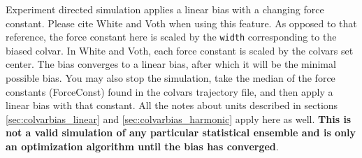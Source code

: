 
Experiment directed simulation applies a linear bias with a changing
force constant. Please cite White and Voth \cite{White2014} when
using this feature. As opposed to that reference, the force constant here is scaled
by the \texttt{width} corresponding to the biased colvar. In White and
Voth, each force constant is scaled by the colvars set center. The
bias converges to a linear bias, after which it will be the minimal
possible bias. You may also stop the simulation, take the median of
the force constants (ForceConst) found in the colvars trajectory file,
and then apply a linear bias with that constant. All the notes about
units described in sections \ref{sec:colvarbias_linear}
and \ref{sec:colvarbias_harmonic} apply here as well. {\bf This is not
a valid simulation of any particular statistical ensemble and is only
an optimization algorithm until the bias has converged}.

